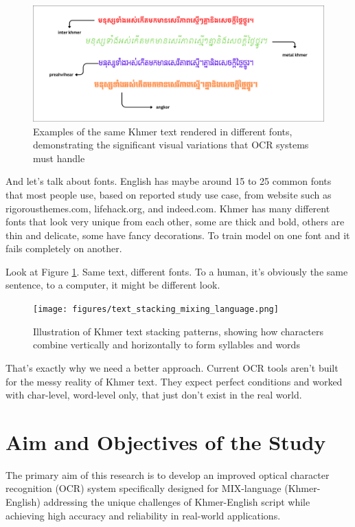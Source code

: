 \begin{figure}[H]
    \centering
    \includegraphics[width=\textwidth]{figures/varianty_of_font.png}
    \caption{Examples of the same Khmer text rendered in different fonts, demonstrating the significant visual variations that OCR systems must handle}
    \label{fig:font_variants}
\end{figure}

And let's talk about fonts. English has maybe around 15 to 25 common fonts that most people use,
based on reported study use case, from website such as rigorousthemes.com, lifehack.org, and indeed.com. 
Khmer has many different fonts that look very unique from each other, some are thick and bold, others are 
thin and delicate, some have fancy decorations. To train model on one font and 
it fails completely on another.

Look at Figure \ref{fig:font_variants}. Same text, different fonts. To a human, 
it's obviously the same sentence, to a computer, it might be different look.

\begin{figure}[H]
    \centering
    \texttt{[image: figures/text\_stacking\_mixing\_language.png]}
    \caption{Illustration of Khmer text stacking patterns, 
    showing how characters combine vertically and horizontally 
    to form syllables and words \citep{buoy2023khmerocr}}
    \label{fig:text_stacking}
\end{figure}

That's exactly why we need a better approach. Current OCR tools aren't 
built for the messy reality of Khmer text. They expect perfect conditions
and worked with char-level, word-level only,
that just don't exist in the real world.

\section{Aim and Objectives of the Study}
\label{sec:objectives}

The primary aim of this research is to develop an improved optical character 
recognition (OCR) system specifically designed for MIX-language (Khmer-English) 
addressing the unique challenges of Khmer-English script while achieving high 
accuracy and reliability in real-world applications.

